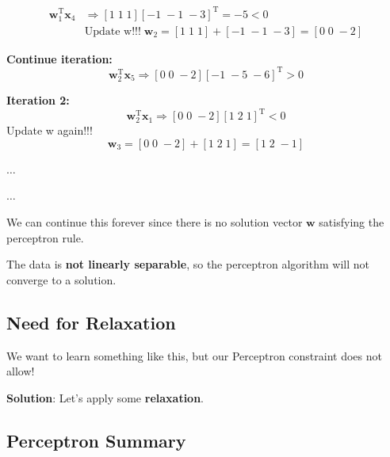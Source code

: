 \documentclass[11pt,a4paper]{article}
\theoremstyle{definition}
\theoremstyle{plain}
\theoremstyle{remark}
\begin{document}
\begin{align*}
\mathbf{w}_1^{\mathrm{T}} \mathbf{x}_4 &\Rightarrow [1 \; 1 \; 1][-1 \; -1 \; -3]^{\mathrm{T}} = -5 < 0 \\
&\text{Update w!!!} \; \mathbf{w}_2 = [1 \; 1 \; 1] + [-1 \; -1 \; -3] = [0 \; 0 \; -2]
\end{align*}

\textbf{Continue iteration:}
\[
\mathbf{w}_2^{\mathrm{T}} \mathbf{x}_5 \Rightarrow [0 \; 0 \; -2][-1 \; -5 \; -6]^{\mathrm{T}} > 0
\]

\textbf{Iteration 2:}
\[
\mathbf{w}_2^{\mathrm{T}} \mathbf{x}_1 \Rightarrow [0 \; 0 \; -2][1 \; 2 \; 1]^{\mathrm{T}} < 0
\]
Update w again!!!
\[
\mathbf{w}_3 = [0 \; 0 \; -2] + [1 \; 2 \; 1] = [1 \; 2 \; -1]
\]

$\ldots$

$\ldots$

\begin{tcolorbox}[colback=red!10!white,colframe=red!75!black,title=\textbf{Non-Convergence Result}]
We can continue this forever since there is no solution vector $\mathbf{w}$ satisfying the perceptron rule.

The data is \textbf{not linearly separable}, so the perceptron algorithm will not converge to a solution.
\end{tcolorbox}

\subsection{Need for Relaxation}

We want to learn something like this, but our Perceptron constraint does not allow!

\textbf{Solution}: Let's apply some \textbf{relaxation}.

\subsection{Perceptron Summary}
\end{document}
